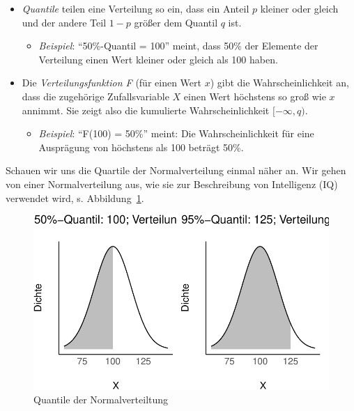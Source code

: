 \documentclass[
  a4paper,
  DIV=11]{scrreprt}
\providecommand{\tightlist}{%
  \setlength{\itemsep}{0pt}\setlength{\parskip}{0pt}}\usepackage{longtable,booktabs,array}
\theoremstyle{definition}
\theoremstyle{remark}
\begin{document}
\begin{itemize}
\tightlist
\item
  \emph{Quantile} teilen eine Verteilung so ein, dass ein Anteil \(p\)
  kleiner oder gleich und der andere Teil \(1-p\) größer dem Quantil
  \(q\) ist.

  \begin{itemize}
  \tightlist
  \item
    \emph{Beispiel}: ``50\%-Quantil = 100'' meint, dass 50\% der
    Elemente der Verteilung einen Wert kleiner oder gleich als 100
    haben.
  \end{itemize}
\item
  Die \emph{Verteilungsfunktion F} (für einen Wert \(x\)) gibt die
  Wahrscheinlichkeit an, dass die zugehörige Zufallsvariable \(X\) einen
  Wert höchstens so groß wie \(x\) annimmt. Sie zeigt also die
  kumulierte Wahrscheinlichkeit \([-\infty, q)\).

  \begin{itemize}
  \tightlist
  \item
    \emph{Beispiel}: ``F(100) = 50\%'' meint: Die Wahrscheinlichkeit für
    eine Ausprägung von höchstens als 100 beträgt 50\%.
  \end{itemize}
\end{itemize}

Schauen wir uns die Quartile der Normalverteilung einmal näher an. Wir
gehen von einer Normalverteilung aus, wie sie zur Beschreibung von
Intelligenz (IQ) verwendet wird, s. Abbildung~\ref{fig-nv-quants}.

\begin{figure}

{\centering \includegraphics{./Verteilungen_files/figure-pdf/fig-nv-quants-1.pdf}

}

\caption{\label{fig-nv-quants}Quantile der Normalverteiltung}

\end{figure}
\end{document}
